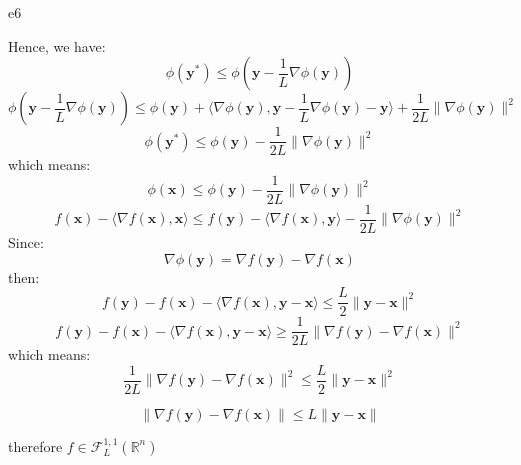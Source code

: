 \documentclass{article}
\newcommand{\xB}{\bm{x}}
\newcommand{\yB}{\bm{y}}
\begin{document}
\begin{PROOF}{e6}
\begin{enumerate}
		Hence, we have:
		\[
		\phi(\yB^*) \leq \phi\left(\yB - \frac{1}{L}\nabla\phi(\yB)\right)
		\]
		\[
		\phi\left(\yB - \frac{1}{L}\nabla\phi(\yB)\right) \leq \phi(\yB) + \langle\nabla\phi(\yB), \yB - \frac{1}{L}\nabla\phi(\yB) - \yB\rangle + \frac{1}{2L}\|\nabla\phi(\yB)\|^2
		\]
		\[
		\phi(\yB^*) \leq \phi(\yB) - \frac{1}{2L}\|\nabla\phi(\yB	)\|^2
		\]
		which means:
		\[
		\phi(\xB) \leq \phi(\yB) - \frac{1}{2L}\|\nabla\phi(\yB)\|^2
		\]
		\[
		f(\xB) - \langle\nabla f(\xB), \xB\rangle \leq f(\yB) - \langle\nabla f(\xB), \yB\rangle - \frac{1}{2L}\|\nabla \phi(\yB)\|^2
		\]
		Since:	
		\[
		\nabla\phi(\yB) = \nabla f(\yB) - \nabla f(\xB)
		\]
		then:
		\[
		f(\yB) - f(\xB) - \langle\nabla f(\xB), \yB - \xB\rangle \leq \frac{L}{2}\|\yB - \xB	\|^2
		\]
		\[
		f(\yB) - f(\xB) - \langle\nabla f(\xB), \yB - \xB\rangle \geq \frac{1}{2L}\|\nabla f(\yB) - \nabla f(\xB)\|^2
		\]
		which means:
		\[
		\frac{1}{2L}\|\nabla f(\yB) - \nabla f(\xB)\|^2 \leq \frac{L}{2}\|\yB - \xB	\|^2
		\]

		\[
		\|\nabla f(\yB) - \nabla f(\xB)\| \leq L\|\yB - \xB	\|
		\]

		therefore \(f \in \mathcal{F}^{1,1}_L(\mathbb{R}^n)\)
		
	\end{enumerate}
\end{PROOF}
\end{document}

